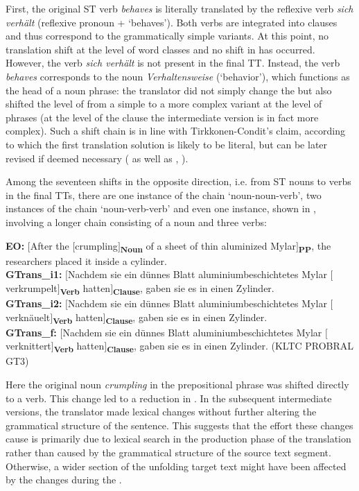 \documentclass[output=paper]{LSP/langsci}
\begin{document}
First, the original ST verb \textit{behaves} is literally translated by the reflexive verb \textit{sich verhält} (reflexive pronoun + `behaves'). Both verbs are integrated into clauses and thus correspond to the grammatically simple variants. At this point, no translation shift at the level of word classes and no shift in  has occurred. However, the verb \textit{sich verhält} is not present in the final TT. Instead, the verb \textit{behaves} corresponds to the noun \textit{Verhaltensweise} (`behavior'), which functions as the head of a noun phrase: the translator did not simply change the  but also shifted the level of  from a simple to a more complex variant at the level of phrases (at the level of the clause the intermediate version is in fact more complex). Such a shift chain is in line with Tirkkonen-Condit's \citeyearpar{TirkkonenCondit2005} claim, according to which the first translation solution is likely to be literal, but can be later revised if deemed necessary (\citealt{TirkkonenCondit2008} as well as \citealt{Schaeffer2013Shared}, \citealt{Halverson2015}).

Among the seventeen shifts in the opposite direction, i.e. from ST nouns to verbs in the final TTs, there are one instance of the chain `noun-noun-verb', two instances of the chain `noun-verb-verb' and even one instance, shown in , involving a longer chain consisting of a noun and three verbs:

\ea \label{serbinaetal:ex:11}
\textbf{EO:} $[$After the $[$crumpling$]$\textsubscript{\textbf{Noun}} of a sheet of thin aluminized Mylar$]$\textsubscript{\textbf{PP}}, the researchers placed it inside a cylinder. \\
\textbf{GTrans\_i1:} $[$Nachdem sie ein dünnes Blatt aluminiumbeschichtetes Mylar $[$verkrumpelt$]$\textsubscript{\textbf{Verb}} hatten$]$\textsubscript{\textbf{Clause}}, gaben sie es in einen Zylinder. \\
\textbf{GTrans\_i2:} $[$Nachdem sie ein dünnes Blatt aluminiumbeschichtetes Mylar $[$verknäuelt$]$\textsubscript{\textbf{Verb}} hatten$]$\textsubscript{\textbf{Clause}}, gaben sie es in einen Zylinder. \\
\textbf{GTrans\_f:} $[$Nachdem sie ein dünnes Blatt aluminiumbeschichtetes Mylar $[$verknittert$]$\textsubscript{\textbf{Verb}} hatten$]$\textsubscript{\textbf{Clause}}, gaben sie es in einen Zylinder. (KLTC PROBRAL GT3)
\z


\largerpage[-1]%
Here the original noun \textit{crumpling} in the prepositional phrase was shifted directly to a verb. This change led to a reduction in . In the subsequent intermediate versions, the translator made lexical changes without further altering the grammatical structure of the sentence. This suggests that the effort these changes cause is primarily due to lexical search in the production phase of the translation rather than  caused by the grammatical structure of the source text segment. Otherwise, a wider section of the unfolding target text might have been affected by the changes during the . 
\end{document}

